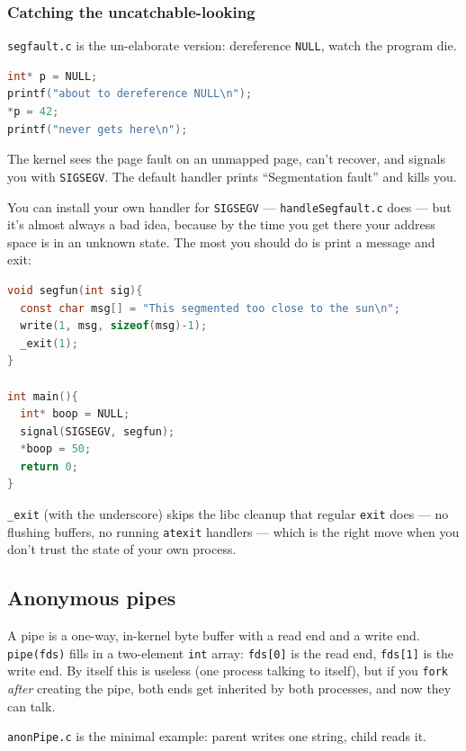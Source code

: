 \documentclass[11pt]{article}
\begin{document}
\subsubsection*{Catching the uncatchable-looking}

\texttt{segfault.c} is the un-elaborate version: dereference
\texttt{NULL}, watch the program die.

\begin{lstlisting}[language=C]
int* p = NULL;
printf("about to dereference NULL\n");
*p = 42;
printf("never gets here\n");
\end{lstlisting}

The kernel sees the page fault on an unmapped page, can't recover,
and signals you with \texttt{SIGSEGV}. The default handler prints
``Segmentation fault'' and kills you.

You can install your own handler for \texttt{SIGSEGV} ---
\texttt{handleSegfault.c} does --- but it's almost always a bad
idea, because by the time you get there your address space is in an
unknown state. The most you should do is print a message and exit:

\begin{lstlisting}[language=C]
void segfun(int sig){
  const char msg[] = "This segmented too close to the sun\n";
  write(1, msg, sizeof(msg)-1);
  _exit(1);
}

int main(){
  int* boop = NULL;
  signal(SIGSEGV, segfun);
  *boop = 50;
  return 0;
}
\end{lstlisting}

\texttt{\_exit} (with the underscore) skips the libc cleanup that
regular \texttt{exit} does --- no flushing buffers, no running
\texttt{atexit} handlers --- which is the right move when you don't
trust the state of your own process.

\subsection*{Anonymous pipes}

A pipe is a one-way, in-kernel byte buffer with a read end and a
write end. \texttt{pipe(fds)} fills in a two-element \texttt{int}
array: \texttt{fds[0]} is the read end, \texttt{fds[1]} is the write
end. By itself this is useless (one process talking to itself),
but if you \texttt{fork} \emph{after} creating the pipe, both ends
get inherited by both processes, and now they can talk.

\texttt{anonPipe.c} is the minimal example: parent writes one
string, child reads it.
\end{document}
